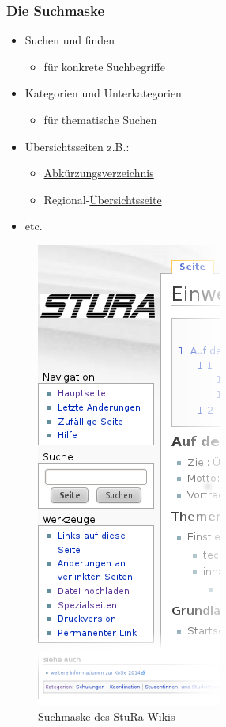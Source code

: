 \documentclass{beamer}              %
\begin{document}
\begin{frame}
  \frametitle{Die Suchmaske}

  \begin{itemize}[<+->]
    \item Suchen und finden
    \begin{itemize}
      \item für konkrete Suchbegriffe
    \end{itemize}
    \item Kategorien und Unterkategorien
    \begin{itemize}
      \item für thematische Suchen
    \end{itemize}
    \item Übersichtsseiten z.B.:
    \begin{itemize}
      \item \href{http://wiki.stura.htw-dresden.de/index.php/Kategorie:Abk\%C3\%BCrzung}{Abkürzungsverzeichnis}
      \item Regional-\href{http://food.the-empire.de/index.php/Hauptseite}{Übersichtsseite}
    \end{itemize}
    \item etc.
  \end{itemize}
  \begin{figure}
    \includegraphics[scale=0.25]{Stura-Wiki-Seitenleiste}
    \caption{Suchmaske des StuRa-Wikis}
    \label{fig:Suchmaske}
  \end{figure}
\end{frame}
\end{document}
